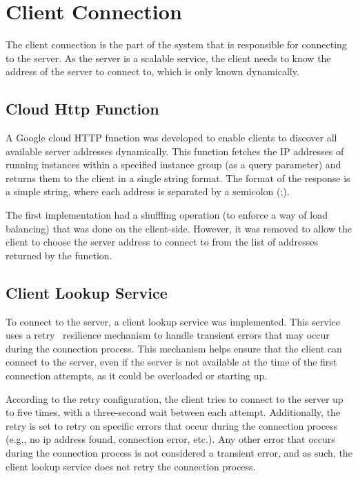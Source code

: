 \chapter{Client Connection}\label{ch:client-connection}

The client connection is the part of the system that is responsible for connecting to the server.
As the server is a scalable service, the client needs to know the address of the server to connect to, which is only known dynamically.


\section{Cloud Http Function}\label{sec:cloud-http-functions}

A Google cloud HTTP function was developed to enable clients to discover all available server addresses dynamically.
This function fetches the IP addresses of running instances within a specified instance group
(as a query parameter) and returns them to the client in a single string format.
The format of the response is a simple string, where each address is separated by a semicolon (;).

The first implementation had a shuffling operation
(to enforce a way of load balancing) that was done on the client-side.
However, it was removed to allow the client to choose the server address to connect to from the list of addresses returned by the function.


\section{Client Lookup Service}\label{sec:client-lookup-service}

To connect to the server, a client lookup service was implemented.
This service uses a retry~\cite{retry-pattern} resilience mechanism to handle transient errors that may occur during the connection process.
This mechanism helps ensure that the client can connect to the server,
even if the server is not available at the time of the first connection attempts, as it could be overloaded or starting up.

According to the retry configuration, the client tries to connect to the server up to five times,
with a three-second wait between each attempt.
Additionally,
the retry is set to retry on specific errors that occur during the connection process
(e.g., no ip address found, connection error, etc.).
Any other error that occurs during the connection process is not considered a transient error, and as such, the client lookup service does not retry the connection process.

